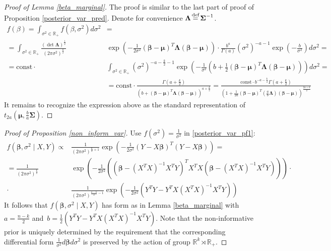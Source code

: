 \documentclass[10pt,fleqn]{amsart}
\theoremstyle{definition}
\theoremstyle{remark}
\numberwithin{equation}{section}
\newcommand{\RR}{\mathbb{R}}
\newcommand{\eq}{\stackrel{\mathclap{\normalfont\text{def}}}{=}}
\newcommand{\const}{\text{const}}
\newcommand{\bbeta}{\boldsymbol{\beta}}
\newcommand{\mmu}{\boldsymbol{\mu}}
\newcommand{\SSigma}{\boldsymbol{\Sigma}}
\newcommand{\LLambda}{\boldsymbol{\Lambda}}
\newcommand{\XTX}{X^TX}
\newcommand{\XTY}{X^TY}
\newcommand{\XTXi}{\left(X^TX\right)^{-1}}
\begin{document}
\begin{proof}[Proof of Lemma \ref{beta_marginal}]
The proof is similar to the last part of proof of Proposition \ref{posterior_var_pred}. Denote for convenience $\LLambda\eq\SSigma^{-1}$.
\begin{equation*}
    \begin{split}
        f(\beta)=\int_{\sigma^2\in\RR_+}f\left(\beta,\sigma^2\right)d\sigma^2&=\\
        =\int_{\sigma^2\in\RR_+}\frac{\left(\det\LLambda\right)^{\frac 12}}{\left(2\pi\sigma^2\right)^{\frac k2}}&
        \exp\left(-\frac 1{2\sigma^2}(\bbeta-\mmu)^T\LLambda(\bbeta-\mmu)\right)\cdot\frac{{b}^{a}}
        {\Gamma(a)}\left(\sigma^2\right)^{-a-1}\exp\left(-\frac{b}{\sigma^2}\right)d\sigma^2=\\
        =\const\cdot&\int_{\sigma^2\in\RR_+}\left(\sigma^2\right)^{-a-\frac k 2 -1}\exp\left(-\frac 1{\sigma^2}
        \left(b+\frac 12(\bbeta-\mmu)^T\LLambda(\bbeta-\mmu)\right)\right)d\sigma^2=\\
        &=\const\cdot \frac{\Gamma{\left(a+\frac k 2\right)}}{\left(b+(\bbeta-\mmu)^T\LLambda(\bbeta-\mmu)\right)^{a+\frac k 2}}=
        \frac{\const \cdot b^{-a-\frac k2}\Gamma{\left(a+\frac k 2\right)}}{\left(1+\frac 1{2a}(\bbeta-\mmu)^T\left(\frac ab\LLambda\right)(\bbeta-\mmu)\right)^{\frac {2a+k}2}}
    \end{split}
\end{equation*}
It remains to recognize the expression above as the standard representation of $t_{2a}\left(\mmu,\frac ba\SSigma\right)$.
\end{proof}
\begin{proof}[Proof of Proposition \ref{non_inform_var}]
Use $\displaystyle f(\sigma^2)=\frac 1 {\sigma^2}$ in \ref{posterior_var_pf1}:
\begin{equation*}
    \begin{split}
        f\left(\bbeta,\sigma^2\mid X,Y\right)\propto&\frac 1{\left(2\pi\sigma^2\right)^{\frac n 2+1}}
        \exp\left(-\frac 1{2\sigma^2}\left(Y-X\bbeta\right)^T\left(Y-X\bbeta\right)\right)=\\        
        =\frac 1{\left(2\pi\sigma^2\right)^{\frac k 2}}&
        \exp\left(-\frac 1{2\sigma^2}\left(\left(\bbeta-\XTXi\XTY\right)^T\XTX\left(\bbeta-\XTXi\XTY\right)\right)\right)\cdot \\
        \cdot&\frac 1{\left(2\pi\sigma^2\right)^{\frac {n-k}2-1}}
        \exp{\left(-\frac 1 {2\sigma^2}\left(Y^TY-Y^TX\XTXi\XTY \right)\right)}
    \end{split}
\end{equation*}
It follows that $f\left(\bbeta,\sigma^2\mid X,Y\right)$ has form as in Lemma \ref{beta_marginal}
with $\displaystyle a=\frac{n-k}2$ and~$\displaystyle b=\frac 12 \left(Y^TY-Y^TX\XTXi\XTY \right)$.
Note that the non-informative prior is uniquely determined by the requirement that the corresponding differential form
$\displaystyle \frac 1{\sigma^2}d\bbeta d\sigma^2$ is preserved by the action of group $\RR^k\rtimes \RR_+$.
\end{proof}
\end{document}
